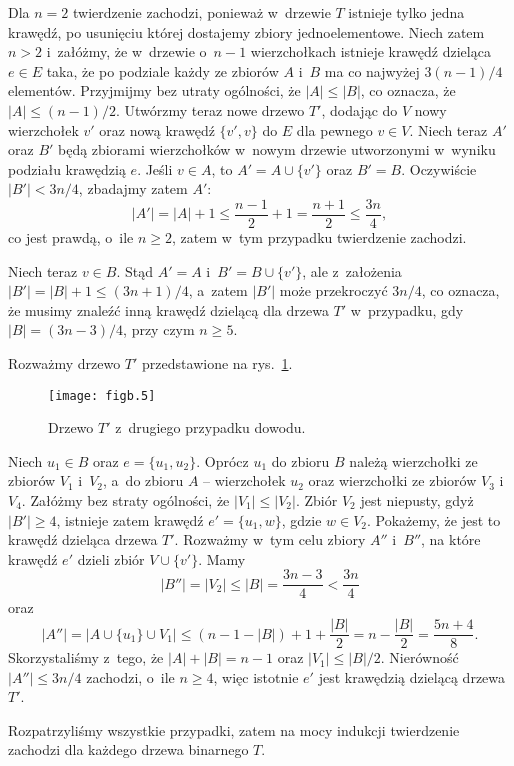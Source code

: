 Dla $n=2$ twierdzenie zachodzi, ponieważ w~drzewie $T$ istnieje tylko jedna krawędź, po usunięciu której dostajemy zbiory jednoelementowe. Niech zatem $n>2$ i~załóżmy, że w~drzewie o~$n-1$ wierzchołkach istnieje krawędź dzieląca $e\in E$ taka, że po podziale każdy ze zbiorów $A$ i~$B$ ma co najwyżej $3(n-1)/4$ elementów. Przyjmijmy bez utraty ogólności, że $|A|\le|B|$, co oznacza, że $|A|\le(n-1)/2$. Utwórzmy teraz nowe drzewo $T'$, dodając do $V$ nowy wierzchołek $v'$ oraz nową krawędź $\{v',v\}$ do $E$ dla pewnego $v\in V$. Niech teraz $A'$ oraz $B'$ będą zbiorami wierzchołków w~nowym drzewie utworzonymi w~wyniku podziału krawędzią $e$. Jeśli $v\in A$, to $A'=A\cup\{v'\}$ oraz $B'=B$. Oczywiście $|B'|<3n/4$, zbadajmy zatem $A'$:
\[
	|A'| = |A|+1 \le \frac{n-1}{2}+1 = \frac{n+1}{2} \le \frac{3n}{4},
\]
co jest prawdą, o~ile $n\ge2$, zatem w~tym przypadku twierdzenie zachodzi.

Niech teraz $v\in B$. Stąd $A'=A$ i~$B'=B\cup \{v'\}$, ale z~założenia $|B'|=|B|+1\le(3n+1)/4$, a~zatem $|B'|$ może przekroczyć $3n/4$, co oznacza, że musimy znaleźć inną krawędź dzielącą dla drzewa $T'$ w~przypadku, gdy $|B|=(3n-3)/4$, przy czym $n\ge5$.

Rozważmy drzewo $T'$ przedstawione na rys.~\ref{fig:B-3a}.
\begin{figure}[ht]
	\begin{center}
		\texttt{[image: figb.5]}
	\end{center}
	\caption{Drzewo $T'$ z~drugiego przypadku dowodu.} \label{fig:B-3a}
\end{figure}
Niech $u_1\in B$ oraz $e=\{u_1,u_2\}$. Oprócz $u_1$ do zbioru $B$ należą wierzchołki ze zbiorów $V_1$ i~$V_2$, a~do zbioru $A$ -- wierzchołek $u_2$ oraz wierzchołki ze zbiorów $V_3$ i~$V_4$. Załóżmy bez straty ogólności, że $|V_1|\le|V_2|$. Zbiór $V_2$ jest niepusty, gdyż $|B'|\ge4$, istnieje zatem krawędź $e'=\{u_1,w\}$, gdzie $w\in V_2$. Pokażemy, że jest to krawędź dzieląca drzewa $T'$. Rozważmy w~tym celu zbiory $A''$ i~$B''$, na które krawędź $e'$ dzieli zbiór $V\cup\{v'\}$. Mamy
\[
	|B''| = |V_2| \le |B| = \frac{3n-3}{4} < \frac{3n}{4}
\]
oraz
\[
	|A''| = \bigl|A\cup\{u_1\}\cup V_1\bigr| \le (n-1-|B|)+1+\frac{|B|}{2} = n-\frac{|B|}{2} = \frac{5n+4}{8}.
\]
Skorzystaliśmy z~tego, że $|A|+|B|=n-1$ oraz $|V_1|\le|B|/2$. Nierówność $|A''|\le3n/4$ zachodzi, o~ile $n\ge4$, więc istotnie $e'$ jest krawędzią dzielącą drzewa $T'$.

Rozpatrzyliśmy wszystkie przypadki, zatem na mocy indukcji twierdzenie zachodzi dla każdego drzewa binarnego $T$.

